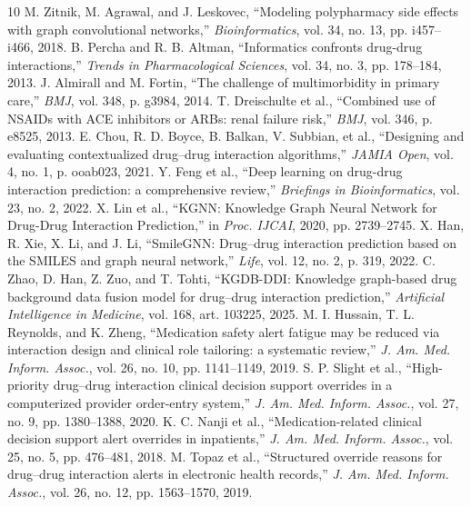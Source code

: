 \documentclass[conference]{IEEEtran}
\begin{document}

\begin{thebibliography}{10}
 M. Zitnik, M. Agrawal, and J. Leskovec, ``Modeling polypharmacy side effects with graph convolutional networks,'' \textit{Bioinformatics}, vol. 34, no. 13, pp. i457--i466, 2018.
 B. Percha and R. B. Altman, ``Informatics confronts drug-drug interactions,'' \textit{Trends in Pharmacological Sciences}, vol. 34, no. 3, pp. 178--184, 2013.
 J. Almirall and M. Fortin, ``The challenge of multimorbidity in primary care,'' \textit{BMJ}, vol. 348, p. g3984, 2014.
 T. Dreischulte et al., ``Combined use of NSAIDs with ACE inhibitors or ARBs: renal failure risk,'' \textit{BMJ}, vol. 346, p. e8525, 2013.
 E. Chou, R. D. Boyce, B. Balkan, V. Subbian, et al., ``Designing and evaluating contextualized drug--drug interaction algorithms,'' \textit{JAMIA Open}, vol. 4, no. 1, p. ooab023, 2021.
 Y. Feng et al., ``Deep learning on drug-drug interaction prediction: a comprehensive review,'' \textit{Briefings in Bioinformatics}, vol. 23, no. 2, 2022.
 X. Lin et al., ``KGNN: Knowledge Graph Neural Network for Drug-Drug Interaction Prediction,'' in \textit{Proc. IJCAI}, 2020, pp. 2739--2745.
 X. Han, R. Xie, X. Li, and J. Li, ``SmileGNN: Drug--drug interaction prediction based on the SMILES and graph neural network,'' \textit{Life}, vol. 12, no. 2, p. 319, 2022.
 C. Zhao, D. Han, Z. Zuo, and T. Tohti, ``KGDB-DDI: Knowledge graph-based drug background data fusion model for drug--drug interaction prediction,'' \textit{Artificial Intelligence in Medicine}, vol. 168, art. 103225, 2025.
 M. I. Hussain, T. L. Reynolds, and K. Zheng, ``Medication safety alert fatigue may be reduced via interaction design and clinical role tailoring: a systematic review,'' \textit{J. Am. Med. Inform. Assoc.}, vol. 26, no. 10, pp. 1141--1149, 2019.
 S. P. Slight et al., ``High-priority drug--drug interaction clinical decision support overrides in a computerized provider order-entry system,'' \textit{J. Am. Med. Inform. Assoc.}, vol. 27, no. 9, pp. 1380--1388, 2020.
 K. C. Nanji et al., ``Medication-related clinical decision support alert overrides in inpatients,'' \textit{J. Am. Med. Inform. Assoc.}, vol. 25, no. 5, pp. 476--481, 2018.
 M. Topaz et al., ``Structured override reasons for drug--drug interaction alerts in electronic health records,'' \textit{J. Am. Med. Inform. Assoc.}, vol. 26, no. 12, pp. 1563--1570, 2019.

\end{thebibliography}
\end{document}

